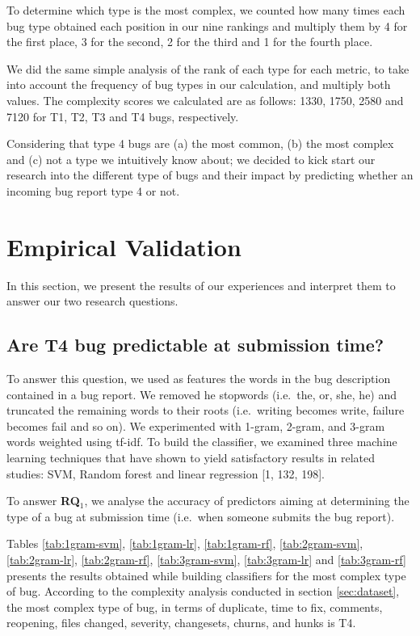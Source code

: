 \documentclass[12pt]{report}
\begin{document}
To determine which type is the most complex, we counted how many times
each bug type obtained each position in our nine rankings and multiply
them by 4 for the first place, 3 for the second, 2 for the third and 1
for the fourth place.

We did the same simple analysis of the rank of each type for each
metric, to take into account the frequency of bug types in our
calculation, and multiply both values. The complexity scores we
calculated are as follows: 1330, 1750, 2580 and 7120 for T1, T2, T3 and
T4 bugs, respectively.

Considering that type 4 bugs are (a) the most common, (b) the most
complex and (c) not a type we intuitively know about; we decided to kick
start our research into the different type of bugs and their impact by
predicting whether an incoming bug report type 4 or not.

\section{Empirical Validation}\label{empirical-validation-4}

In this section, we present the results of our experiences and interpret
them to answer our two research questions.

\subsection{Are T4 bug predictable at submission
time?}\label{are-t4-bug-predictable-at-submission-time}

To answer this question, we used as features the words in the bug
description contained in a bug report. We removed he stopwords
(i.e.~the, or, she, he) and truncated the remaining words to their roots
(i.e.~writing becomes write, failure becomes fail and so on). We
experimented with 1-gram, 2-gram, and 3-gram words weighted using
tf-idf. To build the classifier, we examined three machine learning
techniques that have shown to yield satisfactory results in related
studies: SVM, Random forest and linear regression {[}1, 132, 198{]}.

To answer \textbf{RQ\(_1\)}, we analyse the accuracy of predictors
aiming at determining the type of a bug at submission time (i.e.~when
someone submits the bug report).

Tables \ref{tab:1gram-svm}, \ref{tab:1gram-lr}, \ref{tab:1gram-rf},
\ref{tab:2gram-svm}, \ref{tab:2gram-lr}, \ref{tab:2gram-rf},
\ref{tab:3gram-svm}, \ref{tab:3gram-lr} and \ref{tab:3gram-rf} presents
the results obtained while building classifiers for the most complex
type of bug. According to the complexity analysis conducted in section
\ref{sec:dataset}, the most complex type of bug, in terms of duplicate,
time to fix, comments, reopening, files changed, severity, changesets,
churns, and hunks is T4.
\end{document}
